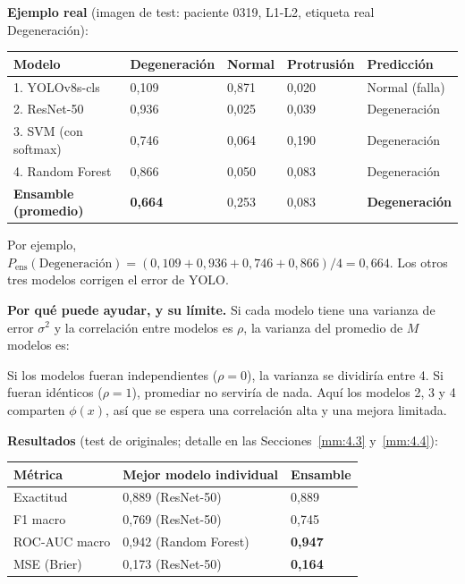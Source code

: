 \textbf{Ejemplo real} (imagen de test: paciente 0319, L1-L2, etiqueta real Degeneración):

\begin{table}[htbp]
\centering\small
\begin{tabular}{lllll}
\toprule
Modelo & Degeneración & Normal & Protrusión & Predicción \\
\midrule
1. YOLOv8s-cls & 0,109 & 0,871 & 0,020 & Normal (falla) \\
2. ResNet-50 & 0,936 & 0,025 & 0,039 & Degeneración \\
3. SVM (con softmax) & 0,746 & 0,064 & 0,190 & Degeneración \\
4. Random Forest & 0,866 & 0,050 & 0,083 & Degeneración \\
\textbf{Ensamble (promedio)} & \textbf{0,664} & 0,253 & 0,083 & \textbf{Degeneración} \\
\bottomrule
\end{tabular}
\end{table}


Por ejemplo, $P_{\text{ens}}(\text{Degeneración}) = (0{,}109 + 0{,}936 + 0{,}746 + 0{,}866) / 4 = 0{,}664$. Los otros tres modelos corrigen el error de YOLO.

\textbf{Por qué puede ayudar, y su límite.} Si cada modelo tiene una varianza de error $\sigma^2$ y la correlación entre modelos es $\rho$, la varianza del promedio de $M$ modelos es:

\begin{center}
\end{center}

Si los modelos fueran independientes ($\rho = 0$), la varianza se dividiría entre 4. Si fueran idénticos ($\rho = 1$), promediar no serviría de nada. Aquí los modelos 2, 3 y 4 comparten $\phi(x)$, así que se espera una correlación alta y una mejora limitada.

\textbf{Resultados} (test de originales; detalle en las Secciones~\ref{mm:4.3} y~\ref{mm:4.4}):

\begin{table}[htbp]
\centering\small
\begin{tabular}{lll}
\toprule
Métrica & Mejor modelo individual & Ensamble \\
\midrule
Exactitud & 0,889 (ResNet-50) & 0,889 \\
F1 macro & 0,769 (ResNet-50) & 0,745 \\
ROC-AUC macro & 0,942 (Random Forest) & \textbf{0,947} \\
MSE (Brier) & 0,173 (ResNet-50) & \textbf{0,164} \\
\bottomrule
\end{tabular}
\end{table}


